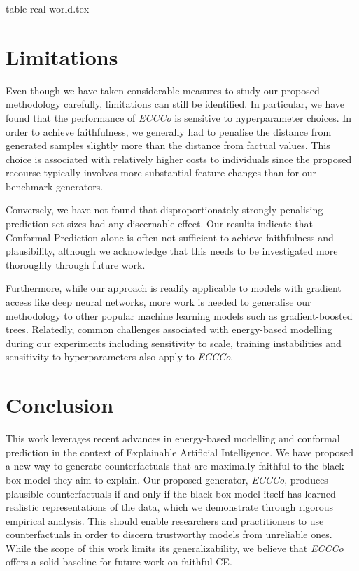 \documentclass{article}
\begin{document}
{table-real-world.tex}

\section{Limitations}

Even though we have taken considerable measures to study our proposed methodology carefully, limitations can still be identified. In particular, we have found that the performance of \textit{ECCCo} is sensitive to hyperparameter choices. In order to achieve faithfulness, we generally had to penalise the distance from generated samples slightly more than the distance from factual values. This choice is associated with relatively higher costs to individuals since the proposed recourse typically involves more substantial feature changes than for our benchmark generators.

Conversely, we have not found that disproportionately strongly penalising prediction set sizes had any discernable effect. Our results indicate that Conformal Prediction alone is often not sufficient to achieve faithfulness and plausibility, although we acknowledge that this needs to be investigated more thoroughly through future work.

Furthermore, while our approach is readily applicable to models with gradient access like deep neural networks, more work is needed to generalise our methodology to other popular machine learning models such as gradient-boosted trees. Relatedly, common challenges associated with energy-based modelling during our experiments including sensitivity to scale, training instabilities and sensitivity to hyperparameters also apply to \textit{ECCCo}.

\section{Conclusion}

This work leverages recent advances in energy-based modelling and conformal prediction in the context of Explainable Artificial Intelligence. We have proposed a new way to generate counterfactuals that are maximally faithful to the black-box model they aim to explain. Our proposed generator, \textit{ECCCo}, produces plausible counterfactuals if and only if the black-box model itself has learned realistic representations of the data, which we demonstrate through rigorous empirical analysis. This should enable researchers and practitioners to use counterfactuals in order to discern trustworthy models from unreliable ones. While the scope of this work limits its generalizability, we believe that \textit{ECCCo} offers a solid baseline for future work on faithful CE.
\end{document}
